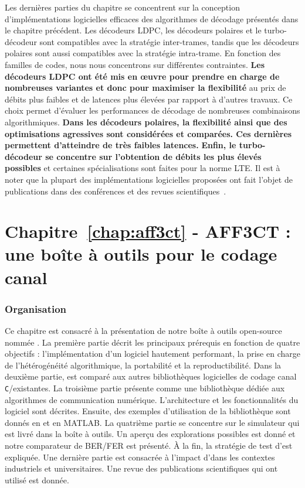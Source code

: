 Les dernières parties du chapitre se concentrent sur la conception
d'implémentations logicielles efficaces des algorithmes de décodage présentés
dans le chapitre précédent. Les décodeurs LDPC, les décodeurs polaires et le
turbo-décodeur sont compatibles avec la stratégie inter-trames, tandis que les
décodeurs polaires sont aussi compatibles avec la stratégie intra-trame. En
fonction des familles de codes, nous nous concentrons sur différentes
contraintes. \textbf{Les décodeurs LDPC ont été mis en œuvre pour prendre en
charge de nombreuses variantes et donc pour maximiser la flexibilité} au prix de
débits plus faibles et de latences plus élevées par rapport à d'autres travaux.
Ce choix permet d'évaluer les performances de décodage de nombreuses
combinaisons algorithmiques. \textbf{Dans les décodeurs polaires, la flexibilité
ainsi que des optimisations agressives sont considérées et comparées. Ces
dernières permettent d'atteindre de très faibles latences.} \textbf{Enfin, le
turbo-décodeur se concentre sur l'obtention de débits les plus élevés possibles}
et certaines spécialisations sont faites pour la norme LTE. Il est à noter que
la plupart des implémentations logicielles proposées ont fait l'objet de
publications dans des conférences et des revues
scientifiques~\cite{Ghaffari2019,Leonardon2019,Cassagne2015c,Cassagne2016b,
Cassagne2016a}.

\section*{Chapitre~\ref{chap:aff3ct} - AFF3CT : une boîte à outils pour le codage canal}

\subsubsection*{Organisation}

Ce chapitre est consacré à la présentation de notre boîte à outils open-source
nommée \AFFECT. La première partie décrit les principaux prérequis en fonction
de quatre objectifs : l'implémentation d'un logiciel hautement performant, la
prise en charge de l'hétérogénéité algorithmique, la portabilité et la
reproductibilité. Dans la deuxième partie, \AFFECT est comparé aux autres
bibliothèques logicielles de codage canal \verb|C|/\Cxx existantes. La troisième
partie présente \AFFECT comme une bibliothèque dédiée aux algorithmes de
communication numérique. L'architecture et les fonctionnalités du logiciel sont
décrites. Ensuite, des exemples d'utilisation de la bibliothèque sont donnés en
\Cxx et en MATLAB\R. La quatrième partie se concentre sur le simulateur \AFFECT
qui est livré dans la boîte à outils. Un aperçu des explorations possibles est
donné et notre comparateur de BER/FER est présenté. À la fin, la stratégie de
test d'\AFFECT est expliquée. Une dernière partie est consacrée à l'impact
d'\AFFECT dans les contextes industriels et universitaires. Une revue des
publications scientifiques qui ont utilisé \AFFECT est donnée.

